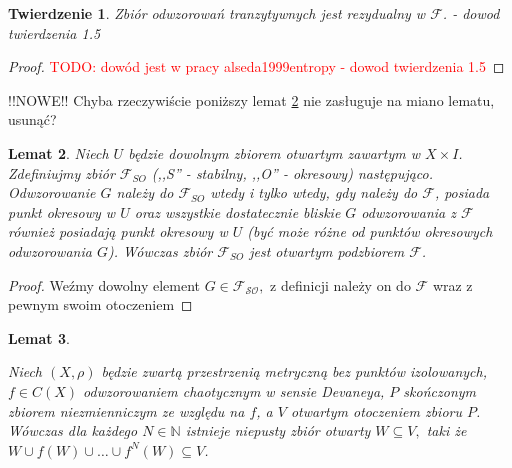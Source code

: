 \documentclass[licencjacka]{pwr_wmat_praca_dyplomowa}
\theoremstyle{plain}
\newtheorem{theorem}{Twierdzenie}
\numberwithin{theorem}{chapter}
\newtheorem{lemma}[theorem]{Lemat}
\theoremstyle{definition}
\numberwithin{theorem}{chapter}
\begin{document}
\begin{theorem} \label{tranzytywne_rezydualne_w_F}
Zbiór odwzorowań tranzytywnych jest rezydualny w $\mathcal{F}$.
\cite{alseda1999entropy} - dowod twierdzenia 1.5
\end{theorem}

\begin{proof}
\textcolor{red}{TODO: dowód jest w pracy {alseda1999entropy} - dowod twierdzenia 1.5}
\end{proof}


{\color{red} !!NOWE!! Chyba rzeczywiście poniższy lemat \ref{Fso_sa_otwartymi_podzbiorami_F} nie zasługuje na miano lematu, usunąć?
\begin{lemma} \label{Fso_sa_otwartymi_podzbiorami_F}
Niech $U$ będzie dowolnym zbiorem otwartym zawartym w $X \times I$. Zdefiniujmy zbiór $\mathcal{F}_{SO}$ (,,S'' - stabilny, ,,O'' - okresowy) następująco. Odwzorowanie $G$ należy do $\mathcal{F}_{SO}$ wtedy i tylko wtedy, gdy należy do $\mathcal{F}$, posiada punkt okresowy w $U$ oraz wszystkie dostatecznie bliskie $G$ odwzorowania z $\mathcal{F}$ również posiadają punkt okresowy w $U$ (być może różne od punktów okresowych odwzorowania $G$).
Wówczas zbiór $\mathcal{F}_{SO}$ jest otwartym podzbiorem $\mathcal{F}$.
\end{lemma}

\begin{proof}
Weźmy dowolny element $G \in \mathcal{F_{SO}},$ z definicji należy on do $\mathcal{F}$ wraz z pewnym swoim otoczeniem
\end{proof}
}



\begin{lemma}
\label{w_otoczeniu_niezmienniczego_jest_otwarty_zawarty_w_iteracjach}

Niech $(X, \rho)$ będzie zwartą przestrzenią metryczną bez punktów izolowanych, $f \in C(X)$ odwzorowaniem chaotycznym w sensie Devaneya, $P$ skończonym zbiorem niezmienniczym ze względu na $f$, a $V$ otwartym otoczeniem zbioru $P$.
Wówczas dla każdego $N \in \mathbb{N}$ istnieje niepusty zbiór otwarty $W \subseteq V,$ taki że $W \cup f(W) \cup \ldots \cup f^N(W) \subseteq V$.
\end{lemma}
\end{document}
